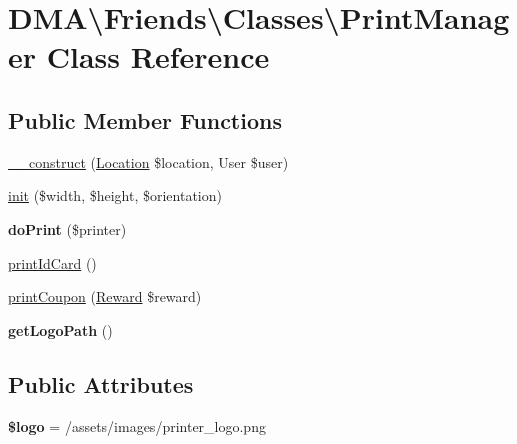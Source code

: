 \hypertarget{classDMA_1_1Friends_1_1Classes_1_1PrintManager}{}\section{D\+M\+A\textbackslash{}Friends\textbackslash{}Classes\textbackslash{}Print\+Manager Class Reference}
\label{classDMA_1_1Friends_1_1Classes_1_1PrintManager}
\subsection*{Public Member Functions}
\begin{DoxyCompactItemize}
\item 
\hyperlink{classDMA_1_1Friends_1_1Classes_1_1PrintManager_a030f6bbbecf05585a2b111795a6d620f}{\+\_\+\+\_\+construct} (\hyperlink{classDMA_1_1Friends_1_1Models_1_1Location}{Location} \$location, User \$user)
\item 
\hyperlink{classDMA_1_1Friends_1_1Classes_1_1PrintManager_a452bdf8905705bfce94858e232a02d81}{init} (\$width, \$height, \$orientation)
\item 
\hypertarget{classDMA_1_1Friends_1_1Classes_1_1PrintManager_a33e78affc297db7883ecae4e54f76575}{}{\bfseries do\+Print} (\$printer)\label{classDMA_1_1Friends_1_1Classes_1_1PrintManager_a33e78affc297db7883ecae4e54f76575}

\item 
\hyperlink{classDMA_1_1Friends_1_1Classes_1_1PrintManager_a036da54763a007f23c7f477562c47783}{print\+Id\+Card} ()
\item 
\hyperlink{classDMA_1_1Friends_1_1Classes_1_1PrintManager_ab4e5b921c0745a197bb2755145ca78f0}{print\+Coupon} (\hyperlink{classDMA_1_1Friends_1_1Models_1_1Reward}{Reward} \$reward)
\item 
\hypertarget{classDMA_1_1Friends_1_1Classes_1_1PrintManager_a68d263e00a4c7d78c60d4d69bc335fdf}{}{\bfseries get\+Logo\+Path} ()\label{classDMA_1_1Friends_1_1Classes_1_1PrintManager_a68d263e00a4c7d78c60d4d69bc335fdf}

\end{DoxyCompactItemize}
\subsection*{Public Attributes}
\begin{DoxyCompactItemize}
\item 
\hypertarget{classDMA_1_1Friends_1_1Classes_1_1PrintManager_aaf6b4e801f6ebe1c4c3a0266f7de24cf}{}{\bfseries \$logo} = \textquotesingle{}/assets/images/printer\+\_\+logo.\+png\textquotesingle{}\label{classDMA_1_1Friends_1_1Classes_1_1PrintManager_aaf6b4e801f6ebe1c4c3a0266f7de24cf}

\end{DoxyCompactItemize}
